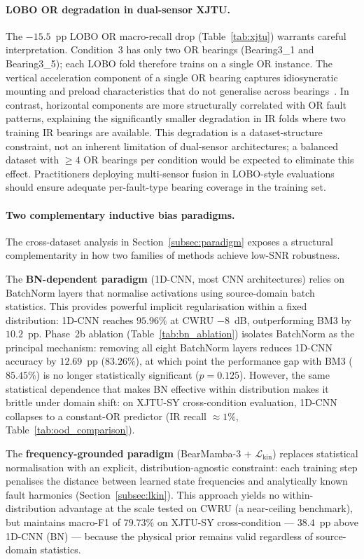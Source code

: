 \paragraph{LOBO OR degradation in dual-sensor XJTU.}
The $-15.5$~pp LOBO OR macro-recall drop (Table~\ref{tab:xjtu}) warrants
careful interpretation.
Condition~3 has only two OR bearings (Bearing3\_1 and Bearing3\_5); each
LOBO fold therefore trains on a single OR instance.
The vertical acceleration component of a single OR bearing captures
idiosyncratic mounting and preload characteristics that do not generalise
across bearings~\cite{xjtu_paper}.
In contrast, horizontal components are more structurally correlated with
OR fault patterns, explaining the significantly smaller degradation in IR
folds where two training IR bearings are available.
This degradation is a dataset-structure constraint, not an inherent
limitation of dual-sensor architectures; a balanced dataset with
$\geq 4$ OR bearings per condition would be expected to eliminate this
effect.
Practitioners deploying multi-sensor fusion in LOBO-style evaluations
should ensure adequate per-fault-type bearing coverage in the training set.

\paragraph{Two complementary inductive bias paradigms.}
The cross-dataset analysis in Section~\ref{subsec:paradigm} exposes a
structural complementarity in how two families of methods achieve
low-SNR robustness.

The \textbf{BN-dependent paradigm} (1D-CNN, most CNN architectures) relies on
BatchNorm layers that normalise activations using source-domain batch statistics.
This provides powerful implicit regularisation within a fixed distribution:
1D-CNN reaches $95.96\%$ at CWRU $-8$~dB, outperforming BM3 by $10.2$~pp.
Phase~2b ablation (Table~\ref{tab:bn_ablation}) isolates BatchNorm as the
principal mechanism: removing all eight BatchNorm layers reduces 1D-CNN
accuracy by $12.69$~pp ($83.26\%$), at which point the performance gap
with BM3 ($85.45\%$) is no longer statistically significant ($p = 0.125$).
However, the same statistical dependence that makes BN effective within
distribution makes it brittle under domain shift: on XJTU-SY cross-condition
evaluation, 1D-CNN collapses to a constant-OR predictor
(IR recall $\approx 1\%$, Table~\ref{tab:ood_comparison}).

The \textbf{frequency-grounded paradigm} (BearMamba-3 + $\mathcal{L}_{\text{kin}}$)
replaces statistical normalisation with an explicit, distribution-agnostic
constraint: each training step penalises the distance between learned state
frequencies and analytically known fault harmonics (Section~\ref{subsec:lkin}).
This approach yields no within-distribution advantage at the scale tested
on CWRU (a near-ceiling benchmark), but maintains macro-F1 of $79.73\%$
on XJTU-SY cross-condition --- $38.4$~pp above 1D-CNN (BN) --- because
the physical prior remains valid regardless of source-domain statistics.

